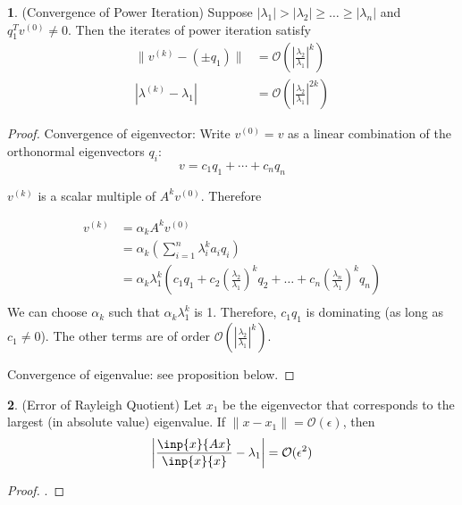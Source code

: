 \documentclass[12pt]{article}
\theoremstyle{definition}
\newcommand{\e}{\epsilon}
\newcommand{\norm}[1]{\lVert#1\rVert}
\newtheorem{theorem}{\color{ForestGreen}{\textbf{Theorem}}}
\theoremstyle{definition}
\begin{document}
\begin{theorem}(Convergence of Power Iteration)
Suppose $|\lambda_1|  > |\lambda_2| \geq \ldots \geq |\lambda_n|$ and $q_1^T v^{(0)} \neq 0$. Then the iterates of power iteration satisfy
\begin{align}
	\norm{v^{(k)} - (\pm q_1)} &= \mathcal{O}\left( \left\vert \frac{\lambda_2}{\lambda_1} \right\vert^k \right) \tag{error of eigenvector} \\
	|\lambda^{(k)} - \lambda_1 | &= \mathcal{O}\left( \left\vert \frac{\lambda_2}{\lambda_1} \right\vert^{2k} \right) \tag{error of eigenvalue}
\end{align}
\end{theorem}

\begin{proof}

Convergence of eigenvector: Write $v^{(0)} = v$ as a linear combination of the orthonormal eigenvectors $q_i$:
\begin{equation}
	v = c_1 q_1 + \cdots + c_nq_n
\end{equation}

$v^{(k)}$ is a scalar multiple of $A^k v^{(0)}$. Therefore

\begin{align*}
	v^{(k)} &= \alpha_k A^k v^{(0)} \tag{$\alpha_k$ a normalization constant} \\
	&= \alpha_k \left(\sum_{i=1}^n \lambda_i^k a_i q_i \right) \\
	&= \alpha_k \lambda_1^k \left( c_1q_1 + c_2 \left(\frac{\lambda_2}{\lambda_1} \right)^k q_2 + \ldots + c_n \left(\frac{\lambda_n}{\lambda_1} \right)^k q_n \right) \\
\end{align*}
We can choose $\alpha_k$ such that $\alpha_k \lambda_1^k$ is 1. Therefore, $c_1 q_1$ is dominating (as long as $c_1 \neq 0$). The other terms are of order $\mathcal{O}\left( \left\vert \frac{\lambda_2}{\lambda_1} \right\vert^k \right)$.

Convergence of eigenvalue: see proposition below.

\end{proof}

\begin{theorem}(Error of Rayleigh Quotient)
Let $x_1$ be the eigenvector that corresponds to the largest (in absolute value) eigenvalue. If $\norm{x - x_1} = \mathcal{O}(\e)$, then
\begin{equation}
	\left\vert \frac{\inp{x}{Ax}}{\inp{x}{x}}  - \lambda_1 \right\vert = \mathcal{O}(\e^2)
\end{equation}
\end{theorem}
\begin{proof}
\color{Red}{TODO}. 
\end{proof}
\end{document}
